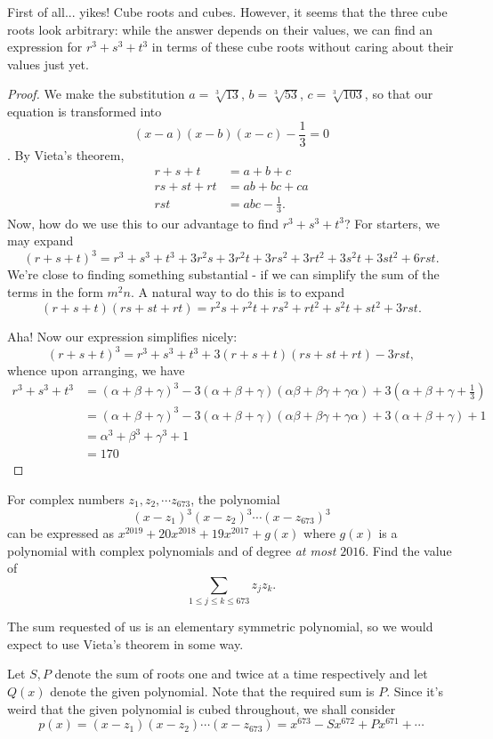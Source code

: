 \documentclass[../jarvis.tex]{subfiles}
\begin{document}
First of all... yikes! Cube roots and cubes. However, it seems that the three cube roots look arbitrary: while the answer depends on their values, we can find an expression for $r^3+s^3+t^3$ in terms of these cube roots without caring about their values just yet. 
\begin{proof}
    We make the substitution $a=\sqrt[3]{13}$, $b=\sqrt[3]{53}$, $c=\sqrt[3]{103}$, so that our equation is transformed into $$(x-a)(x-b)(x-c)-\frac{1}{3}=0$$. By Vieta's theorem, 
\begin{align*}
    r+s+t&=a+b+c \\
    rs+st+rt&=ab+bc+ca \\
    rst&=abc-\frac{1}{3}.
\end{align*}
Now, how do we use this to our advantage to find $r^3+s^3+t^3$? For starters, we may expand
$$(r+s+t)^3=r^3+s^3+t^3+3r^2s+3r^2t+3rs^2+3rt^2+3s^2t+3st^2+6rst.$$
We're close to finding something substantial - if we can simplify the sum of the terms in the form $m^2n$. A natural way to do this is to expand
$$(r+s+t)(rs+st+rt)=r^2s+r^2t+rs^2+rt^2+s^2t+st^2+3rst.$$

Aha! Now our expression simplifies nicely:
$$(r+s+t)^3=r^3+s^3+t^3+3(r+s+t)(rs+st+rt)-3rst,$$
whence upon arranging, we have
\begin{align*}
    r^3+s^3+t^3
    &=(\alpha+\beta+\gamma)^3-3(\alpha+\beta+\gamma)(\alpha\beta+\beta\gamma+\gamma\alpha)+3(\alpha+\beta+\gamma+\frac{1}{3})\\
    &=(\alpha+\beta+\gamma)^3-3(\alpha+\beta+\gamma)(\alpha\beta+\beta\gamma+\gamma\alpha)+3(\alpha+\beta+\gamma)+1 \\
    &=\alpha^3+\beta^3+\gamma^3+1 \\
    &=\boxed{170}
\end{align*}
\end{proof}

\begin{example}[2019 AIME I P10]
For complex numbers $z_1, z_2,\cdots z_{673}$, the polynomial
$$(x-z_1)^3(x-z_2)^3\cdots(x-z_673)^3$$
can be expressed as $x^{2019}+20x^{2018}+19x^{2017}+g(x)$ where $g(x)$ is a polynomial with complex polynomials and of degree \textit{at most} $2016$. Find the value of 
$$\sum_{1\leq j\leq k\leq 673}z_jz_k.$$
\end{example}
The sum requested of us is an elementary symmetric polynomial, so we would expect to use Vieta's theorem in some way.

Let $S, P$ denote the sum of roots one and twice at a time respectively and let $Q(x)$ denote the given polynomial. Note that the required sum is $P$. Since it's weird that the given polynomial is cubed throughout, we shall consider
$$p(x)=(x-z_1)(x-z_2)\cdots(x-z_{673})=x^{673}-Sx^{672}+Px^{671}+\cdots$$
\end{document}
